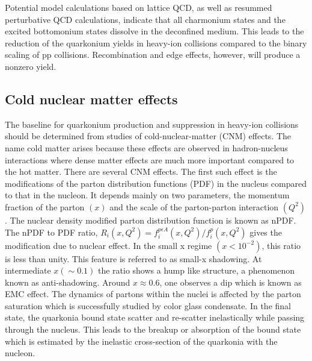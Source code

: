 Potential model calculations based on lattice QCD, as well as resummed 
perturbative QCD calculations, indicate that all charmonium states and the
excited bottomonium states dissolve in the deconfined medium. This leads to 
the reduction of the quarkonium yields in heavy-ion collisions 
compared to the binary scaling of pp collisions. Recombination and edge
effects, however, will produce a nonzero yield.


              
\subsection{Cold nuclear matter effects}

The baseline for quarkonium production and suppression in heavy-ion collisions 
should be determined from studies of
cold-nuclear-matter (CNM) effects. The name cold matter 
arises because these effects are observed in hadron-nucleus interactions 
where dense matter effects are much more important compared to the hot matter.
There are several CNM effects.
The first such effect is the modifications of the parton 
distribution functions (PDF) in the nucleus compared to that in the nucleon.
It depends mainly on two parameters, 
the momentum fraction of the parton $(x)$ and the scale of the parton-parton 
interaction $(Q^2)$. The nuclear density modified parton distribution
function is known as nPDF.
The nPDF to PDF ratio, $R_i(x,Q^2)=f_i^{p \epsilon A} (x, Q^2) /f_i^p  (x, Q^2)$
gives the modification due to nuclear effect. 
In the small x regime $(x < 10^{-2})$, this ratio is less than unity.
This feature is referred to as small-x shadowing. At intermediate  $x(\sim 0.1)$
the ratio shows a hump like structure, a phenomenon known as 
anti-shadowing. Around $x\approx 0.6$, one observes a dip which is known as EMC
effect. The dynamics of partons 
within the nuclei is affected by the parton saturation which is successfully
studied by color glass condensate. In the 
final state, the quarkonia bound state scatter and re-scatter inelastically
while passing through the nucleus. This leads to 
the breakup or absorption of the bound state which is estimated by the
inelastic cross-section of the quarkonia with the nucleon. 

